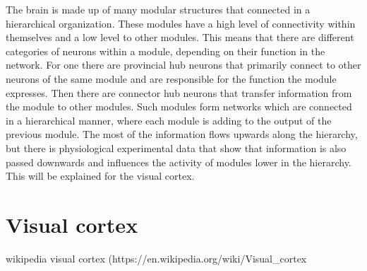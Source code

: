 The brain is made up of many modular structures that connected in a hierarchical organization. These modules have a high level of connectivity within themselves and a low level to other modules. This means that there are different categories of neurons within a module, depending on their function in the network. For one there are provincial hub neurons that primarily connect to other neurons of the same module and are responsible for the function the module expresses. Then there are connector hub neurons that transfer information from the module to other modules. Such modules form networks which are connected in a hierarchical manner, where each module is adding to the output of the previous module. \citep{hierarchicalBrain}
The most of the information flows upwards along the hierarchy, but there is physiological experimental data that show that information is also passed downwards and influences the activity of modules lower in the hierarchy. This will be explained for the visual cortex.

\section{Visual cortex}

wikipedia visual cortex (https://en.wikipedia.org/wiki/Visual_cortex


